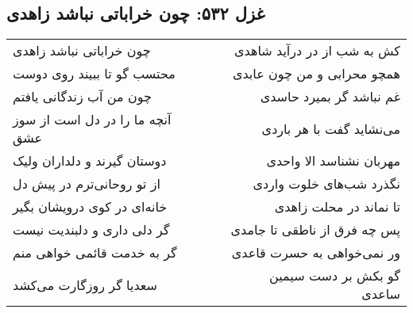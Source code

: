 \begin{center}
\section*{غزل ۵۳۲: چون خراباتی نباشد زاهدی}
\label{sec:532}
\begin{longtable}{l p{0.5cm} r}
چون خراباتی نباشد زاهدی
&&
کش به شب از در درآید شاهدی
\\
محتسب گو تا ببیند روی دوست
&&
همچو محرابی و من چون عابدی
\\
چون من آب زندگانی یافتم
&&
غم نباشد گر بمیرد حاسدی
\\
آنچه ما را در دل است از سوز عشق
&&
می‌نشاید گفت با هر باردی
\\
دوستان گیرند و دلداران ولیک
&&
مهربان نشناسد الا واحدی
\\
از تو روحانی‌ترم در پیش دل
&&
نگذرد شب‌های خلوت واردی
\\
خانه‌ای در کوی درویشان بگیر
&&
تا نماند در محلت زاهدی
\\
گر دلی داری و دلبندیت نیست
&&
پس چه فرق از ناطقی تا جامدی
\\
گر به خدمت قائمی خواهی منم
&&
ور نمی‌خواهی به حسرت قاعدی
\\
سعدیا گر روزگارت می‌کشد
&&
گو بکش بر دست سیمین ساعدی
\\
\end{longtable}
\end{center}
